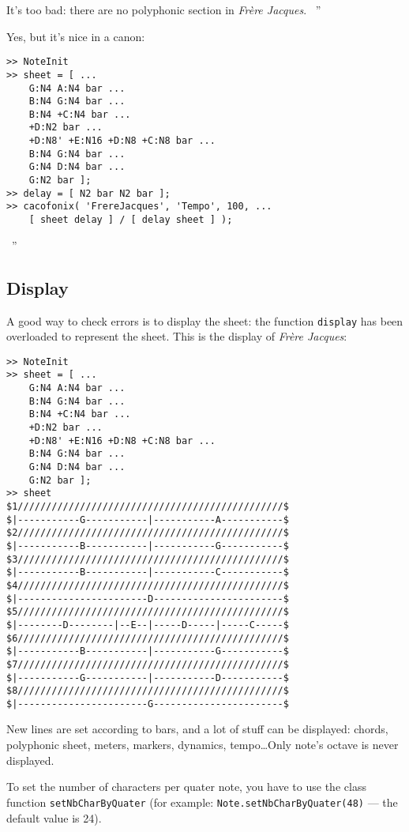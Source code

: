 \documentclass{article}
\newcommand\frerejaques{\emph{Fr\`ere Jacques}\xspace}
\newenvironment{meenv}{ \par \noindent \makebox[6em][r]{ \textcolor{mecolor}{Me}: `` --~}}{~''}
\newenvironment{myselfenv}{ \par \noindent \makebox[6em][r]{ \textcolor{myselfcolor}{Myself}: `` --~}}{~''}
\begin{document}
\begin{meenv}%
It's too bad: there are no polyphonic section in \frerejaques.%
\end{meenv}
\begin{myselfenv}%
Yes, but it's nice in a canon:

\begin{lstlisting}
>> NoteInit
>> sheet = [ ...
	G:N4 A:N4 bar ...
	B:N4 G:N4 bar ...
	B:N4 +C:N4 bar ...
	+D:N2 bar ...
	+D:N8' +E:N16 +D:N8 +C:N8 bar ...
	B:N4 G:N4 bar ...
	G:N4 D:N4 bar ...
	G:N2 bar ];
>> delay = [ N2 bar N2 bar ];
>> cacofonix( 'FrereJacques', 'Tempo', 100, ...
	[ sheet delay ] / [ delay sheet ] );
\end{lstlisting}%
\end{myselfenv}

\subsection{Display}

A good way to check errors is to display the sheet: the function \lstinline!display! has been overloaded to represent the sheet. This is the display of \frerejaques:
\begin{lstlisting}
>> NoteInit
>> sheet = [ ...
	G:N4 A:N4 bar ...
	B:N4 G:N4 bar ...
	B:N4 +C:N4 bar ...
	+D:N2 bar ...
	+D:N8' +E:N16 +D:N8 +C:N8 bar ...
	B:N4 G:N4 bar ...
	G:N4 D:N4 bar ...
	G:N2 bar ];
>> sheet
$1///////////////////////////////////////////////$
$|-----------G-----------|-----------A-----------$
$2///////////////////////////////////////////////$
$|-----------B-----------|-----------G-----------$
$3///////////////////////////////////////////////$
$|-----------B-----------|-----------C-----------$
$4///////////////////////////////////////////////$
$|-----------------------D-----------------------$
$5///////////////////////////////////////////////$
$|--------D--------|--E--|-----D-----|-----C-----$
$6///////////////////////////////////////////////$
$|-----------B-----------|-----------G-----------$
$7///////////////////////////////////////////////$
$|-----------G-----------|-----------D-----------$
$8///////////////////////////////////////////////$
$|-----------------------G-----------------------$
\end{lstlisting}

New lines are set according to bars, and a lot of stuff can be displayed: chords, polyphonic sheet, meters, markers, dynamics, tempo\dots Only note's octave is never displayed.

To set the number of characters per quater note, you have to use the class function \lstinline!setNbCharByQuater! (for example: \lstinline!Note.setNbCharByQuater(48)! --- the default value is 24).
\end{document}
